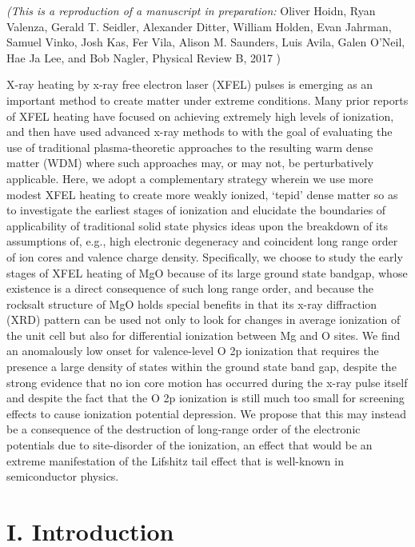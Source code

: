 \emph{(This is a reproduction of a manuscript in preparation: }
Oliver Hoidn, Ryan Valenza, Gerald
T. Seidler, Alexander Ditter, William Holden, Evan
Jahrman, Samuel Vinko, Josh Kas, Fer Vila, Alison M.
Saunders, Luis Avila, Galen
O'Neil, Hae Ja Lee, and Bob Nagler,
Physical Review B, 2017
)



\begin{addmargin}[4em]{1em}
X-ray heating by x-ray free electron laser (XFEL) pulses is emerging as
an important method to create matter under extreme conditions. Many
prior reports of XFEL heating have focused on achieving extremely high
levels of ionization, and then have used advanced x-ray methods to with
the goal of evaluating the use of traditional plasma-theoretic
approaches to the resulting warm dense matter (WDM) where such
approaches may, or may not, be perturbatively applicable. Here, we adopt
a complementary strategy wherein we use more modest XFEL heating to
create more weakly ionized, `tepid' dense matter so as to investigate
the earliest stages of ionization and elucidate the boundaries of
applicability of traditional solid state physics ideas upon the
breakdown of its assumptions of, e.g., high electronic degeneracy and
coincident long range order of ion cores and valence charge density.
Specifically, we choose to study the early stages of XFEL heating of MgO
because of its large ground state bandgap, whose existence is a direct
consequence of such long range order, and because the rocksalt structure
of MgO holds special benefits in that its x-ray diffraction (XRD)
pattern can be used not only to look for changes in average ionization
of the unit cell but also for differential ionization between Mg and O
sites. We find an anomalously low onset for valence-level O 2p
ionization that requires the presence a large density of states within
the ground state band gap, despite the strong evidence that no ion core
motion has occurred during the x-ray pulse itself and despite the fact
that the O 2p ionization is still much too small for screening effects
to cause ionization potential depression. We propose that this may
instead be a consequence of the destruction of long-range order of the
electronic potentials due to site-disorder of the ionization, an effect
that would be an extreme manifestation of the Lifshitz tail effect that
is well-known in semiconductor physics.
\end{addmargin}



\section{I. Introduction}

